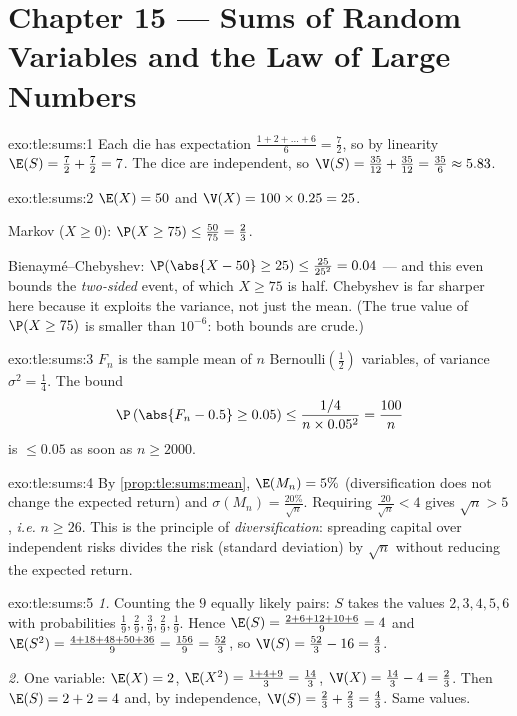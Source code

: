 \section*{Chapter 15 --- Sums of Random Variables and the Law of Large Numbers}

\begin{solution}{exo:tle:sums:1}
Each die has expectation
$\frac{1 + 2 + \dots + 6}{6} = \frac{7}{2}$, so by linearity
$\E(S) = \frac72 + \frac72 = 7$. The dice are independent, so
$\V(S) = \frac{35}{12} + \frac{35}{12} = \frac{35}{6} \approx 5.83$.
\end{solution}

\begin{solution}{exo:tle:sums:2}
$\E(X) = 50$ and $\V(X) = 100 \times 0.25 = 25$.

Markov ($X \geq 0$): $\P(X \geq 75) \leq \frac{50}{75} = \frac23$.

Bienaymé--Chebyshev:
$\P(\abs{X - 50} \geq 25) \leq \frac{25}{25^2} = 0.04$ --- and this even
bounds the \emph{two-sided} event, of which $X \geq 75$ is half. Chebyshev
is far sharper here because it exploits the variance, not just the mean.
(The true value of $\P(X \geq 75)$ is smaller than $10^{-6}$: both bounds
are crude.)
\end{solution}

\begin{solution}{exo:tle:sums:3}
$F_n$ is the sample mean of $n$ Bernoulli$\left(\frac12\right)$ variables,
of variance $\sigma^2 = \frac14$. The bound
\[
\P\left(\abs{F_n - 0.5} \geq 0.05\right)
\leq \frac{1/4}{n \times 0.05^2} = \frac{100}{n}
\]
is $\leq 0.05$ as soon as $n \geq 2000$.
\end{solution}

\begin{solution}{exo:tle:sums:4}
By \cref{prop:tle:sums:mean}, $\E(M_n) = 5\%$ (diversification does not
change the expected return) and
$\sigma(M_n) = \frac{20\%}{\sqrt n}$. Requiring
$\frac{20}{\sqrt n} < 4$ gives $\sqrt n > 5$, \emph{i.e.} $n \geq 26$.
This is the principle of \emph{diversification}: spreading capital over
independent risks divides the risk (standard deviation) by $\sqrt n$
without reducing the expected return.
\end{solution}

\begin{solution}{exo:tle:sums:5}
\emph{1.} Counting the $9$ equally likely pairs: $S$ takes the values
$2, 3, 4, 5, 6$ with probabilities
$\frac19, \frac29, \frac39, \frac29, \frac19$. Hence
$\E(S) = \frac{2 + 6 + 12 + 10 + 6}{9} = 4$ and
$\E(S^2) = \frac{4 + 18 + 48 + 50 + 36}{9} = \frac{156}{9} = \frac{52}{3}$,
so $\V(S) = \frac{52}{3} - 16 = \frac43$.

\emph{2.} One variable: $\E(X) = 2$,
$\E(X^2) = \frac{1 + 4 + 9}{3} = \frac{14}{3}$,
$\V(X) = \frac{14}{3} - 4 = \frac23$. Then $\E(S) = 2 + 2 = 4$ and, by
independence, $\V(S) = \frac23 + \frac23 = \frac43$. Same values.
\end{solution}

